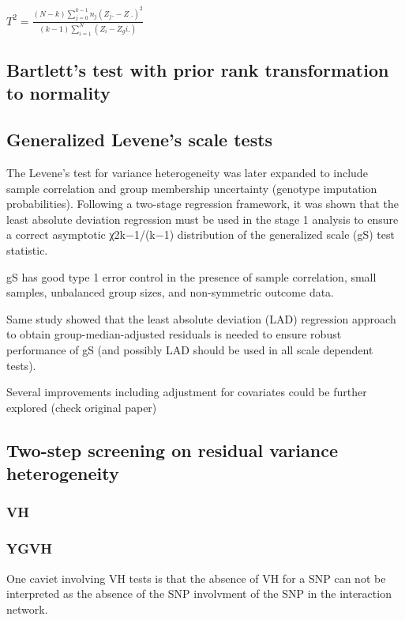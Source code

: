 \documentclass[]{book}
\theoremstyle{definition}
\theoremstyle{definition}
\theoremstyle{definition}
\theoremstyle{remark}
\begin{document}
\(T^2 = \frac{(N-k) \sum_{j=0}^{k-1} n_j(Z_j.-Z_..)^2}{(k-1)\sum_{i=1}^{N}(Z_i-Z_gi.)}\)

\subsection{Bartlett's test with prior rank transformation to
normality}\label{bartletts-test-with-prior-rank-transformation-to-normality}

\subsection{Generalized Levene's scale
tests}\label{generalized-levenes-scale-tests}

The Levene's test for variance heterogeneity was later expanded to
include sample correlation and group membership uncertainty (genotype
imputation probabilities). Following a two-stage regression framework,
it was shown that the least absolute deviation regression must be used
in the stage 1 analysis to ensure a correct asymptotic χ2k−1/(k−1)
distribution of the generalized scale (gS) test statistic.

gS has good type 1 error control in the presence of sample correlation,
small samples, unbalanced group sizes, and non-symmetric outcome data.

Same study showed that the least absolute deviation (LAD) regression
approach to obtain group-median-adjusted residuals is needed to ensure
robust performance of gS (and possibly LAD should be used in all scale
dependent tests).

Several improvements including adjustment for covariates could be
further explored (check original paper)

\subsection{Two-step screening on residual variance
heterogeneity}\label{two-step-screening-on-residual-variance-heterogeneity}

\subsubsection{VH}\label{vh}

\subsubsection{YGVH}\label{ygvh}

One caviet involving VH tests is that the absence of VH for a SNP can
not be interpreted as the absence of the SNP involvment of the SNP in
the interaction network.
\end{document}
